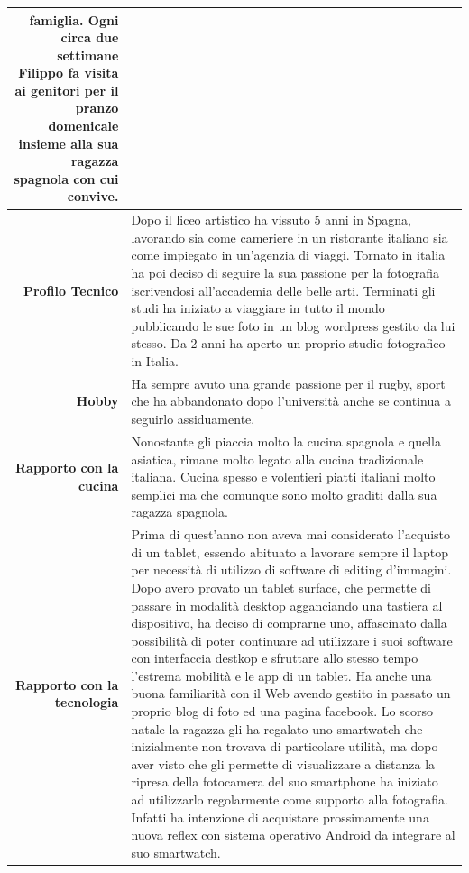 \begin{table}[H]
\begin{centering}
\begin{tabular} { | r  p{12cm} | }
{famiglia. Ogni circa due settimane Filippo fa visita ai genitori per il
pranzo domenicale insieme alla sua ragazza spagnola con cui convive.} \\
\hline
		\textbf{Profilo Tecnico} & Dopo il liceo artistico ha vissuto 5
anni in Spagna, lavorando sia come cameriere in un ristorante italiano
sia come impiegato in un'agenzia di viaggi. Tornato in italia ha poi
deciso di seguire la sua passione per la fotografia iscrivendosi
all'accademia delle belle arti. Terminati gli studi ha iniziato a
viaggiare in tutto il mondo pubblicando le sue foto in un blog wordpress gestito
da lui stesso. Da 2 anni ha aperto un proprio studio fotografico in
Italia. \\ \hline
		\textbf{Hobby} & Ha sempre avuto una grande passione per il
rugby, sport che ha abbandonato dopo l'università anche se continua a
seguirlo assiduamente. \\ \hline
		\textbf{Rapporto con la cucina} & Nonostante gli piaccia molto
la cucina spagnola e quella asiatica, rimane molto legato alla cucina
tradizionale italiana. Cucina spesso e volentieri piatti italiani molto
semplici ma che comunque sono molto graditi dalla sua ragazza spagnola.
\\ \hline
		\textbf{Rapporto con la tecnologia} & Prima di quest'anno non
aveva mai considerato
l'acquisto di un tablet, essendo abituato a lavorare sempre il laptop 
per necessità di utilizzo di software di editing
d'immagini. Dopo avero provato un tablet surface, che permette di
passare in modalità desktop agganciando una tastiera al dispositivo, ha
deciso di comprarne uno, affascinato dalla possibilità di poter
continuare ad utilizzare i suoi software con interfaccia destkop e
sfruttare allo stesso tempo l'estrema mobilità e le app di un tablet.
Ha anche una buona familiarità con il Web avendo gestito in passato un proprio
blog di foto ed una pagina facebook. Lo scorso natale la ragazza gli ha
regalato uno smartwatch che inizialmente non trovava di particolare
utilità, ma dopo aver visto che gli permette di visualizzare a distanza
la ripresa della fotocamera del suo smartphone ha iniziato ad
utilizzarlo regolarmente come supporto alla fotografia. Infatti ha
intenzione di acquistare prossimamente una nuova reflex con sistema
operativo Android da integrare al suo smartwatch.
\\ \hline
	\end{tabular}
	\end{centering}
\end{table}


